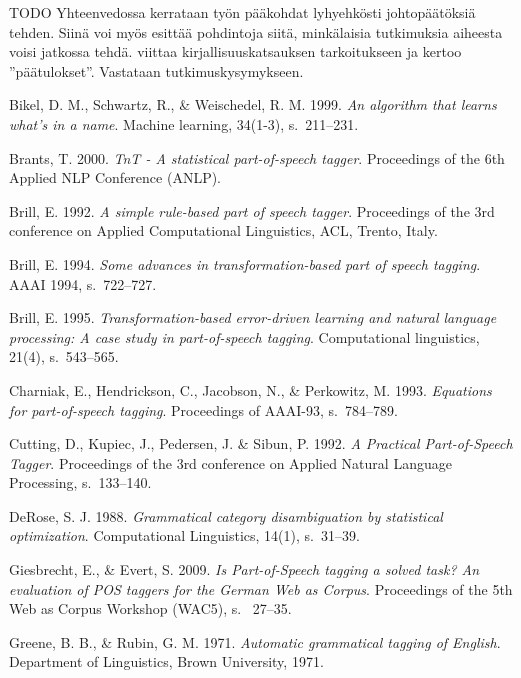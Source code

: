 \documentclass[utf8,bachelor,manualbib]{gradu3}
\begin{document}
TODO Yhteenvedossa kerrataan työn pääkohdat lyhyehkösti johtopäätöksiä tehden. Siinä voi myös esittää pohdintoja siitä, minkälaisia tutkimuksia aiheesta voisi jatkossa tehdä. viittaa kirjallisuuskatsauksen tarkoitukseen ja kertoo ''päätulokset''. Vastataan tutkimuskysymykseen.




\begin{thebibliography}{}

Bikel, D. M., Schwartz, R., \& Weischedel, R. M. 1999. \textit{An algorithm that learns what's in a name}. Machine learning, 34(1-3), s.~211--231.

Brants, T. 2000. \textit{TnT - A statistical part-of-speech tagger}. Proceedings of the 6th Applied NLP Conference (ANLP).

Brill, E. 1992. \textit{A simple rule-based part of speech tagger}. Proceedings of the 3rd conference on Applied Computational Linguistics, ACL, Trento, Italy.

Brill, E. 1994. \textit{Some advances in transformation-based part of speech tagging}. AAAI 1994, s.~722--727.

Brill, E. 1995. \textit{Transformation-based error-driven learning and natural language processing: A case study in part-of-speech tagging}. Computational linguistics, 21(4), s.~543--565.

Charniak, E., Hendrickson, C., Jacobson, N., \& Perkowitz, M. 1993. \textit{Equations for part-of-speech tagging}. Proceedings of AAAI-93, s.~784--789.

Cutting, D., Kupiec, J., Pedersen, J. \& Sibun, P. 1992. \textit{A Practical Part-of-Speech Tagger}. Proceedings of the 3rd conference on Applied Natural Language Processing, s.~133--140.

DeRose, S. J. 1988. \textit{Grammatical category disambiguation by statistical optimization}. Computational Linguistics, 14(1), s.~31--39.

Giesbrecht, E., \& Evert, S. 2009. \textit{Is Part-of-Speech tagging a solved task? An evaluation of POS taggers for the German Web as Corpus}. Proceedings of the 5th Web as Corpus Workshop (WAC5), s.~ 27--35.

Greene, B. B., \& Rubin, G. M. 1971. \textit{Automatic grammatical tagging of English}. Department of Linguistics, Brown University, 1971.


\end{thebibliography}
\end{document}
